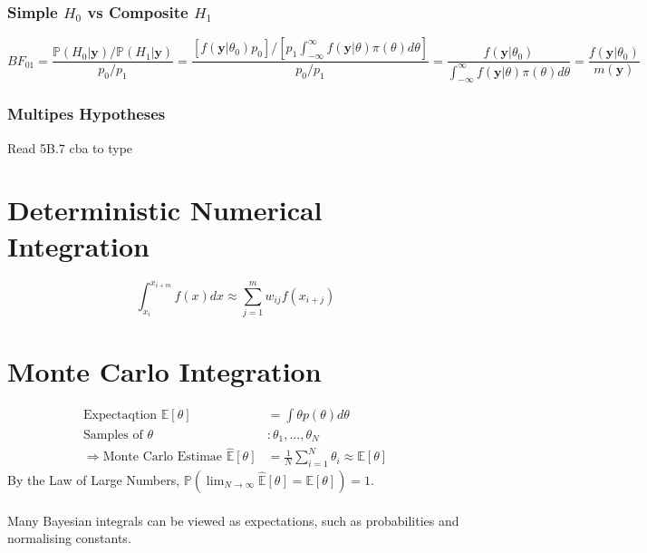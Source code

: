 \documentclass[12pt]{article}
\theoremstyle{definition}
\newcommand{\Prob}[1]{\mathbb{P}(#1)}
\newcommand{\Expect}[1]{\mathbb{E}\left[#1\right]}
\begin{document}
    \subsubsection*{Simple $H_0$ vs Composite $H_1$}
    $$BF_{01} = \frac{\Prob{H_0|\bm{y}}/\Prob{H_1|\bm{y}}}{p_0/p_1} = \frac{\left[ f(\bm{y}|\theta_0)p_0 \right]/ \left[ p_1 \int_{-\infty}^\infty f(\bm{y}|\theta)\pi(\theta) d\theta \right]}{p_0/p_1} = \frac{f(\bm{y}|\theta_0)}{\int_{-\infty}^\infty f(\bm{y}|\theta)\pi(\theta)d\theta} = \frac{f(\bm{y}|\theta_0)}{m(\bm{y})}$$
    \subsubsection*{Multipes Hypotheses}
    Read 5B.7 cba to type

\section{Deterministic Numerical Integration}
$$\int_{x_i}^{x_{i+m}} f(x) dx \approx \sum_{j=1}^m w_{ij} f(x_{i+j})$$

\newpage
\section{Monte Carlo Integration}
\begin{align*}
    \text{Expectaqtion }\Expect{\theta} &= \int\theta p(\theta) d\theta\\
    \text{Samples of } \theta &: \theta_1,...,\theta_N\\
    \Rightarrow \text{Monte Carlo Estimae } \hat{\mathbb{E}}[\theta] &= \frac{1}{N}\sum_{i=1}^N \theta_i \approx \Expect{\theta}
\end{align*}
By the Law of Large Numbers, $\Prob{\lim_{N \rightarrow \infty} \hat{\mathbb{E}}\left[\theta\right] = \Expect{\theta}} = 1$.
\\~\\
Many Bayesian integrals can be viewed as expectations, such as probabilities and normalising constants.
\end{document}

